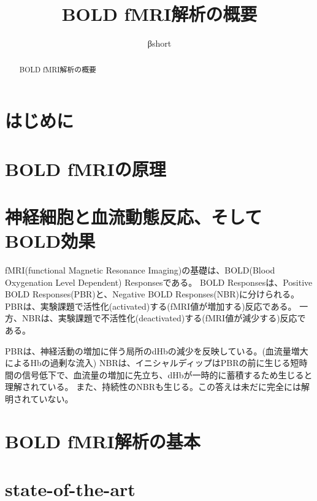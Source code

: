 \documentclass[uplatex, a4j]{jsarticle}
\title{BOLD fMRI解析の概要}
\author{βshort}
\begin{document}
\maketitle

\begin{abstract}
  BOLD fMRI解析の概要
\end{abstract}

\section{はじめに}


\section{BOLD fMRIの原理}


\section{神経細胞と血流動態反応、そしてBOLD効果}
fMRI(functional Magnetic Resonance Imaging)の基礎は、BOLD(Blood Oxygenation Level Dependent) Responsesである。
BOLD Responsesは、Positive BOLD Responses(PBR)と、Negative BOLD Responses(NBR)に分けられる。
PBRは、実験課題で活性化(activated)する(fMRI値が増加する)反応である。
一方、NBRは、実験課題で不活性化(deactivated)する(fMRI値が減少する)反応である。

PBRは、神経活動の増加に伴う局所のdHbの減少を反映している。(血流量増大によるHbの過剰な流入)
NBRは、イニシャルディップはPBRの前に生じる短時間の信号低下で、血流量の増加に先立ち、dHbが一時的に蓄積するため生じると理解されている。
また、持続性のNBRも生じる。この答えは未だに完全には解明されていない。

\section{BOLD fMRI解析の基本}

\section{state-of-the-art}

\begin{thebibliography}{9}
\end{thebibliography}
\end{document}
